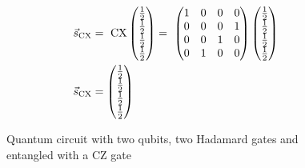 \begin{equation}
    \centering
    \begin{split}
        \vec{s}_{\mathrm{CX}} &=\ \mathrm{CX}\begin{pmatrix}
            \frac{1}{2}\\\frac{1}{2}\\\frac{1}{2}\\\frac{1}{2}
        \end{pmatrix} =\  \begin{pmatrix}
        1 & 0 & 0 & 0 \\
        0 & 0 & 0 & 1 \\
        0 & 0 & 1 & 0 \\
        0 & 1 & 0 & 0
    \end{pmatrix}\begin{pmatrix}
            \frac{1}{2}\\\frac{1}{2}\\\frac{1}{2}\\\frac{1}{2}
        \end{pmatrix} \\
        \vec{s}_{\mathrm{CX}} &= \begin{pmatrix}
            \frac{1}{2}\\\frac{1}{2}\\\frac{1}{2}\\\frac{1}{2}
        \end{pmatrix}
    \end{split}
    \label{equation:cx_entanglement}
\end{equation}


\begin{figure}[!h]
    \centering
    \caption{Quantum circuit with two qubits, two Hadamard gates and entangled with a $\mathrm{CZ}$ gate}
    \label{fig:cz_entanglement}
\end{figure}

